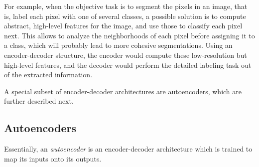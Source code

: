 For example, when the objective task is to segment the pixels in an image, that is, label each pixel with one of several classes, a possible solution is to compute abstract, high-level features for the image, and use those to classify each pixel next. This allows to analyze the neighborhoods of each pixel before assigning it to a class, which will probably lead to more cohesive segmentations. Using an encoder-decoder structure, the encoder would compute these low-resolution but high-level features, and the decoder would perform the detailed labeling task out of the extracted information.

A special subset of encoder-decoder architectures are autoencoders, which are further described next.

\subsection{Autoencoders}

Essentially, an \textit{autoencoder} is an encoder-decoder architecture which is trained to map its inputs onto its outputs.

